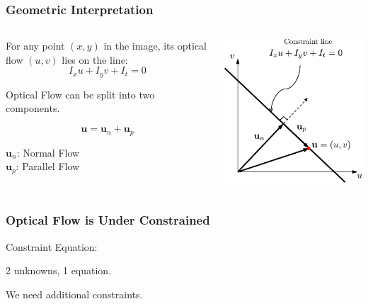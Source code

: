 \begin{frame}
  \frametitle{Geometric Interpretation}

  \begin{columns}
    \begin{column}{0.6\textwidth}  %
      For any point $(x,y)$ in the image, its optical flow $(u,v)$ lies on the line:
      \[
      I_x u + I_y v + I_t = 0
      \]

      Optical Flow can be split into two components.

      \[
      \mathbf{u} = \mathbf{u}_n + \mathbf{u}_p
      \]

      $\mathbf{u}_n$: Normal Flow \\
      $\mathbf{u}_p$: Parallel Flow
    \end{column}
    \begin{column}{0.4\textwidth}
      \begin{center}
        \includegraphics[width=\columnwidth]{./images/optical_flow/optical_flow_geometric_interpretation.pdf}
      \end{center}
    \end{column}
  \end{columns}
\end{frame}

\begin{frame}
  \frametitle{Optical Flow is Under Constrained}

  Constraint Equation: \quad {}

  \vspace{0.5cm}
  2 unknowns, 1 equation.

  \vspace{1cm}
  We need additional constraints.

\end{frame}

